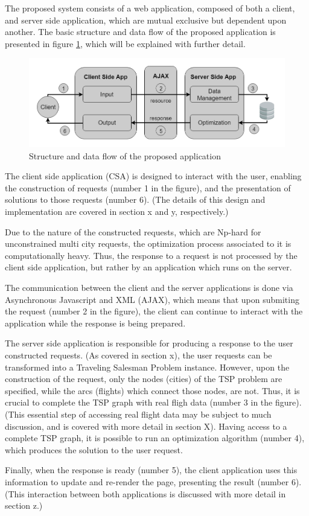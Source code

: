 The proposed system consists of a web application, composed of both a client, and server side application,
which are mutual exclusive but dependent upon another.
The basic structure and data flow of the proposed application is 
presented in figure \ref{fig:system_architecture_design}, which will 
be explained with further detail.


\begin{figure}[htpb]
  \centering
  \includegraphics[width=\textwidth]{./Figures/system_design/system_architecture_design.png}
	\caption{Structure and data flow of the proposed application}
  \label{fig:system_architecture_design}  
\end{figure}


The client side application (CSA) is designed to interact with the user,
enabling the construction of requests (number 1 in the figure), 
and the presentation of solutions to those requests (number 6).
(The details of this design and implementation are covered in section x and y, respectively.)

Due to the nature of the constructed requests, which are Np-hard for unconstrained multi city requests,
the optimization process associated to it is computationally heavy.
Thus, the response to a request is not processed by the client side application,
but rather by an application which runs on the server. 

The communication between the client and the server applications  
is done via Asynchronous Javascript and XML (AJAX),
which means that upon submiting the request (number 2 in the figure),
the client can continue to interact with the application 
while the response is being prepared.

The server side application is responsible for producing a 
response to the user constructed requests.
(As covered in section x), the user requests can be transformed into a Traveling Salesman Problem instance.
However, upon the construction of the request, only the nodes (cities) of the TSP problem are specified,
while the arcs (flights) which connect those nodes, are not.
Thus, it is crucial to complete the TSP graph with real fligh data (number 3 in the figure).
(This essential step of accessing real flight data may be subject to much discussion,
and is covered with more detail in section X).
Having access to a complete TSP graph, it is possible to run an optimization algorithm (number 4),
which produces the solution to the user request.

Finally, when the response is ready (number 5),
the client application uses this information to update and re-render the page, presenting the result (number 6).
(This interaction between both applications is discussed with more detail in section z.)
